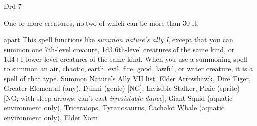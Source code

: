 
\begin{description*}
\item[Level:] Drd 7
\item[Effect:] One or more creatures, no two of which can be more than 30 ft.
\end{description*}

apart
This spell functions like \textit{summon nature's ally I}, except that you can
summon one 7th-level creature, 1d3 6th-level creatures of the same kind, or 1d4+1
lower-level creatures of the same kind.
When you use a summoning spell to summon an air, chaotic, earth, evil, fire, good,
lawful, or water creature, it is a spell of that type.
Summon Nature's Ally VII list: Elder Arrowhawk, Dire Tiger, Greater Elemental (any), Djinni (genie) [NG], Invisible Stalker, Pixie (sprite) [NG; with sleep arrows, can't cast \textit{irresistable dance}], Giant Squid (aquatic environment only), Triceratops, Tyranosaurus, Cachalot Whale (aquatic environment only), Elder Xorn